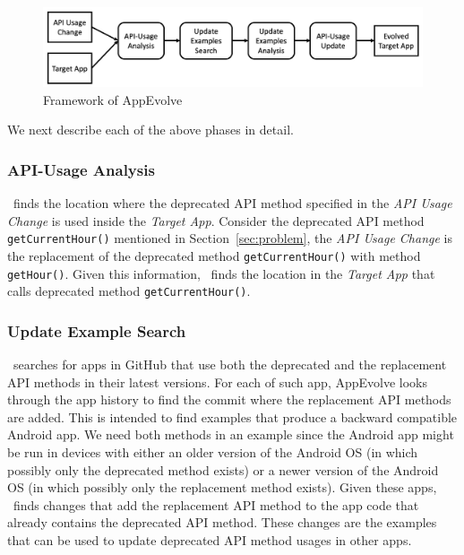 \begin{figure}[t]
	\centering
	\includegraphics[width=0.8\linewidth]{framework.png}
	\caption{Framework of AppEvolve}
	\label{fig:framework}
\end{figure}

We next describe each of the above phases in detail.
\subsubsection{API-Usage Analysis}
\toolname\ finds the location where the deprecated API method specified in the {\em API Usage Change} is used inside the {\em Target App}. Consider the deprecated API method \texttt{getCurrentHour()} mentioned in Section~\ref{sec:problem}, the {\em API Usage Change} is the replacement of the deprecated method \texttt{getCurrentHour()} with method \texttt{getHour()}. Given this information, \toolname\ finds the location in the {\em Target App} that calls deprecated method \texttt{getCurrentHour()}. %

\subsubsection{Update Example Search}
\toolname\ searches for apps in GitHub that use both the deprecated and the replacement API methods in their latest versions.  For each of such app, AppEvolve looks through the app history to find the commit where the replacement API methods are added. This is intended to find examples that produce a backward compatible Android app. We need both methods in an example since the Android app might be run in devices with either an older version of the Android OS (in which possibly only the deprecated method exists) or a newer version of the Android OS (in which possibly only the replacement method exists). Given these apps, \toolname\ finds changes that add the replacement API method to the app code that already contains the deprecated API method. These changes are the examples that can be used to update deprecated API method usages in other apps.

